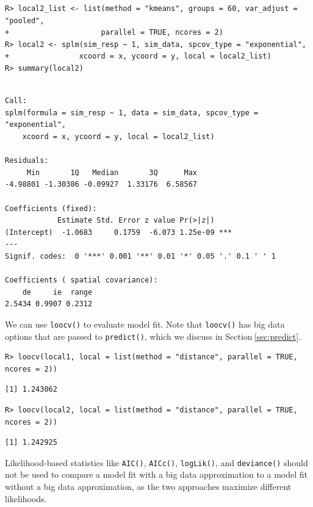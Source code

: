 \documentclass{article}
\begin{document}
\begin{verbatim}
R> local2_list <- list(method = "kmeans", groups = 60, var_adjust = "pooled",
+                     parallel = TRUE, ncores = 2)
R> local2 <- splm(sim_resp ~ 1, sim_data, spcov_type = "exponential", 
+                xcoord = x, ycoord = y, local = local2_list)
R> summary(local2)
\end{verbatim}

\begin{verbatim}

Call:
splm(formula = sim_resp ~ 1, data = sim_data, spcov_type = "exponential", 
    xcoord = x, ycoord = y, local = local2_list)

Residuals:
     Min       1Q   Median       3Q      Max 
-4.98801 -1.30386 -0.09927  1.33176  6.58567 

Coefficients (fixed):
            Estimate Std. Error z value Pr(>|z|)    
(Intercept)  -1.0683     0.1759  -6.073 1.25e-09 ***
---
Signif. codes:  0 '***' 0.001 '**' 0.01 '*' 0.05 '.' 0.1 ' ' 1

Coefficients ( spatial covariance):
    de     ie  range 
2.5434 0.9907 0.2312 
\end{verbatim}

We can use \texttt{loocv()} to evaluate model fit. Note that
\texttt{loocv()} has big data options that are passed to
\texttt{predict()}, which we discuss in Section\(~\)\ref{sec:predict}.

\begin{verbatim}
R> loocv(local1, local = list(method = "distance", parallel = TRUE, ncores = 2))
\end{verbatim}

\begin{verbatim}
[1] 1.243062
\end{verbatim}

\begin{verbatim}
R> loocv(local2, local = list(method = "distance", parallel = TRUE, ncores = 2))
\end{verbatim}

\begin{verbatim}
[1] 1.242925
\end{verbatim}

Likelihood-based statistics like \texttt{AIC()}, \texttt{AICc()},
\texttt{logLik()}, and \texttt{deviance()} should not be used to compare
a model fit with a big data approximation to a model fit without a big
data approximation, as the two approaches maximize different
likelihoods.
\end{document}
